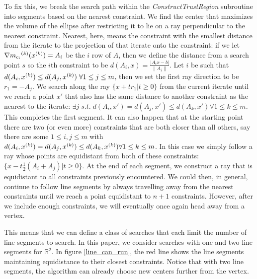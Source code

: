 To fix this, we break the search path within the \emph{ConstructTrustRegion} subroutine into segments based on the nearest constraint.
We find the center that maximizes the volume of the ellipse after restricting it to lie on a ray perpendicular to the nearest constraint.
Nearest, here, means the constraint with the smallest distance from the iterate to the projection of that iterate onto the constraint:
if we let $\nabla {{m}_{c_i}}^{(k)}({x}^{(k)}) = A_i$ be the $i$ row of $A$, then we define the distance from a search point $s$ so the $i$th constraint to be
$d(A_i, x) = \frac {|A_i x - b|}{\|A_i\|}$.
Let $i$ be such that $d(A_i, {x}^{(k)}) \le d(A_j, {x}^{(k)}) \; \forall 1\le j\le m$, then we set the first ray direction to be $r_1=-A_j$.
We search along the ray $\{x +tr_1|t\ge 0\}$ from the current iterate until we reach a point $x'$ that also has the same distance to another constraint as the nearest to the iterate:
$\exists j \;s.t.\; d(A_i, x') = d(A_j, x') \le d(A_k, x') \forall 1\le k \le m$.
This completes the first segment.
It can also happen that at the starting point there are two (or even more) constraints that are both closer than all others, say there are some $1\le i,j\le m$ with $d(A_i, {x}^{(k)}) = d(A_j, {x}^{(k)}) \le d(A_k, {x}^{(k)})  \forall 1\le k \le m$.
In this case we simply follow a ray whose points are equidistant from both of these constraints: $\{x - t\frac 1 2 (A_i + A_j)| t \ge 0\}$.
At the end of each segment, we construct a ray that is equidistant to all constraints previously encountered.
We could then, in general, continue to follow line segments by always travelling away from the nearest constraints until we reach a point equidistant to $n+1$ constraints.
However, after we include enough constraints, we will eventually once again head away from a vertex.

This means that we can define a class of searches that each limit the number of line segments to search.
In this paper, we consider searches with one and two line segments for $\mathbb R^2$.
In figure \ref{line_can_run}, the red line shows the line segments maintaining equidistance to their closest constraints.
Notice that with two line segments, the algorithm can already choose new centers further from the vertex.

